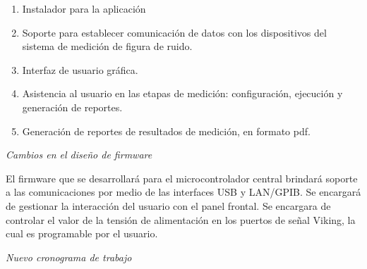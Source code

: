 \documentclass[paper=letter,oneside,fontsize=12pt, parskip=full]{article}
\begin{document}
	\begin{enumerate}
		\item Instalador para la aplicación
		\item Soporte para establecer comunicación de datos con los dispositivos del sistema de medición de figura de ruido.
		\item Interfaz de usuario gráfica.
		\item Asistencia al usuario en las etapas de medición: configuración, ejecución y generación de reportes.
		\item Generación de reportes de resultados de medición, en formato pdf.
	\end{enumerate}

	\emph{Cambios en el diseño de firmware}
	
	El firmware que se desarrollará para el microcontrolador central brindará soporte a las comunicaciones por medio de las interfaces USB y LAN/GPIB. Se encargará de gestionar la interacción del usuario con el panel frontal. Se encargara de controlar el valor de la tensión de alimentación en los puertos de señal Viking, la cual es programable por el usuario.		
	
	
	\emph{Nuevo cronograma de trabajo}
\end{document}
